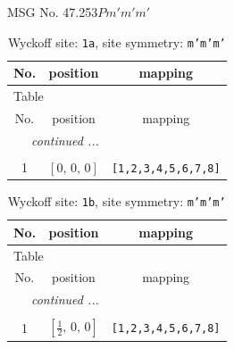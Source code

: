 \documentclass[fleqn,8pt]{jsarticle}
\begin{document}
\setcounter{MaxMatrixCols}{32}

\renewcommand{\tablename}{Table~}
\renewcommand{\figurename}{Figure~}
\begin{center}
\LARGE
MSG No. 47.253\quad$Pm'm'm'$
\end{center}
\renewcommand{\arraystretch}{1.2}
\begin{longtable}{ccc}
\caption{Wyckoff site: {\tt 1a}, site symmetry: {\tt m'm'm'}}
 \\
 \hline \hline
No. & position & mapping \\ \hline \endfirsthead

\multicolumn{2}{l}{\tablename\ \thetable{}} \\
 \hline \hline
No. & position & mapping \\ \hline \endhead

 \hline \hline
\multicolumn{2}{r}{\footnotesize\it continued ...} \\ \endfoot

 \hline \hline
\multicolumn{2}{r}{} \\ \endlastfoot

1 & $\left[ 0,\, 0,\, 0 \right]$ & {\tt [1,2,3,4,5,6,7,8]} \\
\end{longtable}
\renewcommand{\arraystretch}{1.2}
\begin{longtable}{ccc}
\caption{Wyckoff site: {\tt 1b}, site symmetry: {\tt m'm'm'}}
 \\
 \hline \hline
No. & position & mapping \\ \hline \endfirsthead

\multicolumn{2}{l}{\tablename\ \thetable{}} \\
 \hline \hline
No. & position & mapping \\ \hline \endhead

 \hline \hline
\multicolumn{2}{r}{\footnotesize\it continued ...} \\ \endfoot

 \hline \hline
\multicolumn{2}{r}{} \\ \endlastfoot

1 & $\left[ \frac{1}{2},\, 0,\, 0 \right]$ & {\tt [1,2,3,4,5,6,7,8]} \\
\end{longtable}
\renewcommand{\arraystretch}{1.2}
\end{document}
